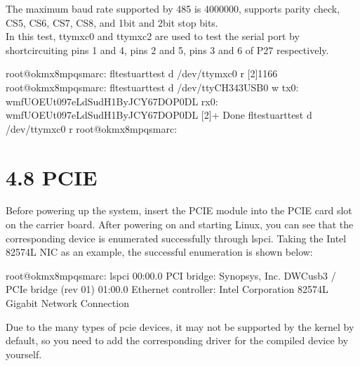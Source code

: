 \documentclass[letterpaper,10pt,openany,english]{sphinxmanual}
\begin{document}
\sphinxAtStartPar
The maximum baud rate supported by 485 is 4000000, supports parity check, CS5, CS6, CS7, CS8, and 1bit and 2bit stop bits.\\
In this test, ttymxc0 and ttymxc2 are used to test the serial port by short\sphinxhyphen{}circuiting pins 1 and 4, pins 2 and 5, pins 3 and 6 of P27 respectively.

\sphinxAtStartPar
{}

\begin{sphinxVerbatim}[commandchars=\\\{\}]
root@ok\PYGZhy{}mx8mpq\PYGZhy{}smarc:\PYGZti{}\PYGZsh{} fltest\PYGZus{}uarttest \PYGZhy{}d /dev/ttymxc0 \PYGZhy{}r \PYGZam{}
[2]1166
root@ok\PYGZhy{}mx8mpq\PYGZhy{}smarc:\PYGZti{}\PYGZsh{} fltest\PYGZus{}uarttest \PYGZhy{}d /dev/ttyCH343USB0 \PYGZhy{}w
tx\PYGZus{}0: wmfUOEUt097eLdSudH1ByJCY67DOP0DL
rx\PYGZus{}0: wmfUOEUt097eLdSudH1ByJCY67DOP0DL
[2]+  Done                    fltest\PYGZus{}uarttest \PYGZhy{}d /dev/ttymxc0 \PYGZhy{}r
root@ok\PYGZhy{}mx8mpq\PYGZhy{}smarc:\PYGZti{}\PYGZsh{}
\end{sphinxVerbatim}


\section{4.8 PCIE}
\label{\detokenize{linux-manual:pcie}}
\sphinxAtStartPar
Before powering up the system, insert the PCIE module into the PCIE card slot on the carrier board. After powering on and starting Linux, you can see that the corresponding device is enumerated successfully through lspci. Taking the Intel 82574L NIC as an example, the successful enumeration is shown below:

\begin{sphinxVerbatim}[commandchars=\\\{\}]
root@ok\PYGZhy{}mx8mpq\PYGZhy{}smarc:\PYGZti{}\PYGZsh{} lspci
00:00.0 PCI bridge: Synopsys, Inc. DWC\PYGZus{}usb3 / PCIe bridge (rev 01)
01:00.0 Ethernet controller: Intel Corporation 82574L Gigabit Network Connection
\end{sphinxVerbatim}

\sphinxAtStartPar
Due to the many types of pcie devices, it may not be supported by the kernel by default, so you need to add the corresponding driver for the compiled device by yourself.
\end{document}
